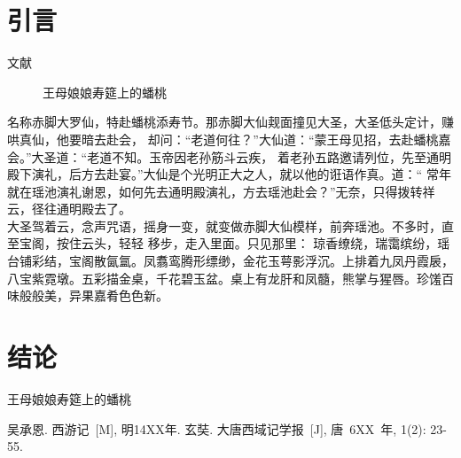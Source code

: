 \documentclass[a4paper,11pt,onecolumn,twoside]{ctexart}
\makeatletter
\newenvironment{figurehere}
  {\def\@captype{figure}}
  {}
\makeatother
\begin{document}
\begin{multicols}{2}
\section{引言}
文献\supercite{Wu,Xuan}
\begin{figure*}
\centering
\caption{王母娘娘寿筵上的蟠桃}\label{fig2}
\end{figure*}

\indent 名称赤脚大罗仙，特赴蟠桃添寿节。那赤脚大仙觌面撞见大圣，大圣低头定计，赚哄真仙，他要暗去赴会，
却问：“老道何往？”大仙道：“蒙王母见招，去赴蟠桃嘉会。”大圣道：“老道不知。玉帝因老孙筋斗云疾，
着老孙五路邀请列位，先至通明殿下演礼，后方去赴宴。”大仙是个光明正大之人，就以他的诳语作真。道：“
常年就在瑶池演礼谢恩，如何先去通明殿演礼，方去瑶池赴会？”无奈，只得拨转祥云，径往通明殿去了。\\
\indent 大圣驾着云，念声咒语，摇身一变，就变做赤脚大仙模样，前奔瑶池。不多时，直至宝阁，按住云头，轻轻
移步，走入里面。只见那里：
琼香缭绕，瑞霭缤纷，瑶台铺彩结，宝阁散氤氲。凤翥鸾腾形缥缈，金花玉萼影浮沉。上排着九凤丹霞扆，
八宝紫霓墩。五彩描金桌，千花碧玉盆。桌上有龙肝和凤髓，熊掌与猩唇。珍馐百味般般美，异果嘉肴色色新。
\section{结论}
\begin{figurehere}
\centering
\caption{王母娘娘寿筵上的蟠桃}\label{fig2}
\end{figurehere}
\small
\begin{thebibliography}{99}
\setlength{\parskip}{0pt}  %
吴承恩. 西游记~[M], 明14XX年.
 玄奘. 大唐西域记学报~[J], 唐~6XX~年, 1(2): 23-55.


\end{thebibliography}
\end{multicols}
\end{document}
